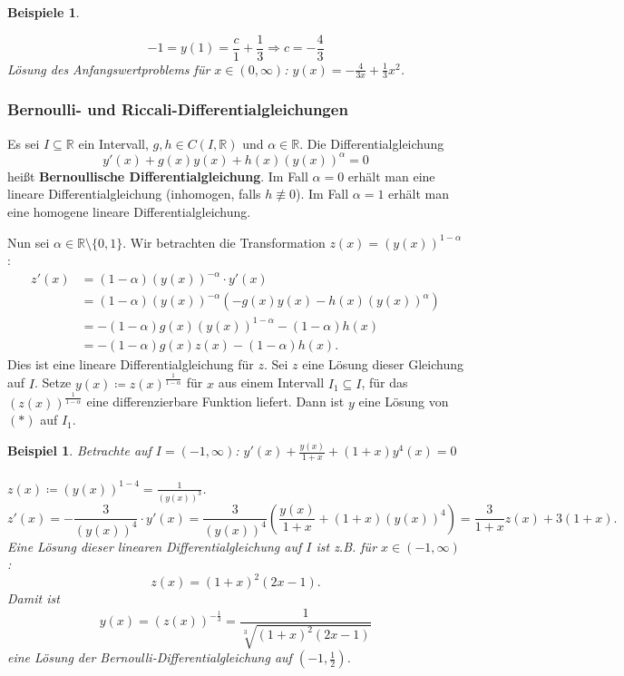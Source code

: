\documentclass[12pt]{extreport} %
\newcommand{\R}{\mathbb{R}}
\theoremstyle{named}
\theoremstyle{nnamed}
\theoremstyle{itshape}
\theoremstyle{normal}
\newtheorem*{beispiel*}{Beispiel}
\newtheorem*{beispiele}{Beispiele}
\begin{document}
\begin{beispiele}
\begin{enumerate}
		$$ - 1 = y(1) = \frac{c}{1} + \frac{1}{3} \Longrightarrow c = -\frac{4}{3} $$
		Lösung des Anfangswertproblems für $x \in (0, \infty)$: $y(x) = -\frac{4}{3x} + \frac{1}{3} x^{2}$.
	\end{enumerate}
\end{beispiele}	
	
 
\subsubsection*{Bernoulli- und Riccali-Differentialgleichungen}

Es sei $I \subseteq \R$ ein Intervall, $g, h \in C(I, \R)$ und $\alpha \in \R$. Die Differentialgleichung
	\begin{equation*}
		y'(x) + g(x) y(x) + h(x) \left( y(x) \right)^{\alpha} = 0 \tag*{$(*)$}
	\end{equation*}
hei{\ss}t \textbf{Bernoullische Differentialgleichung}. Im Fall $\alpha = 0$ erhält man eine lineare Differentialgleichung (inhomogen, falls $h \not\equiv 0$). Im Fall $\alpha = 1$ erhält man eine homogene lineare Differentialgleichung.

\bigskip

Nun sei $\alpha \in \R \setminus \{ 0, 1 \}$. Wir betrachten die Transformation $z(x) = \left( y(x) \right)^{1-\alpha}$:
	\begin{align*}
		z'(x) & = (1-\alpha) \left( y(x) \right)^{-\alpha} \cdot y'(x) \\ 
			  & = (1-\alpha) \left( y(x) \right)^{-\alpha} \left( -g(x)y(x) - h(x) \left( y(x) \right)^{\alpha} \right) \\
			  & = - (1-\alpha) g(x) \left( y(x) \right)^{1-\alpha} - (1 - \alpha) h(x) \\
			  & = - (1-\alpha) g(x) z(x) - (1-\alpha) h(x). 
	\end{align*} 
Dies ist eine lineare Differentialgleichung für $z$. Sei $z$ eine Lösung dieser Gleichung auf $I$. Setze 	$y(x) \coloneqq z(x)^{\frac{1}{1 -\alpha}}$ für $x$ aus einem Intervall $I_{1} \subseteq I$, für das $\left( z(x) \right)^{\frac{1}{1 - \alpha}}$ eine differenzierbare Funktion liefert. Dann ist $y$ eine Lösung von $(*)$ auf $I_{1}$. 

\bigskip

\begin{beispiel*}
	Betrachte auf $I = (-1, \infty)$: $y'(x) + \frac{y(x)}{1 + x} + (1+x) y^{4}(x) = 0$ ~\\
	$z(x) \coloneqq \left( y(x) \right)^{1-4} = \frac{1}{\left( y(x) \right)^{3}}$.
		$$ z'(x) = -\frac{3}{\left( y(x) \right)^{4}} \cdot y'(x) = \frac{3}{\left( y(x) \right)^{4}} \left( \frac{y(x)}{1 + x} + (1+x) \left( y(x) \right)^{4} \right) = \frac{3}{1+x} z(x) + 3(1+x). $$
	Eine Lösung dieser linearen Differentialgleichung auf $I$ ist z.B. für $x \in (-1, \infty)$:
		$$ z(x) = (1+x)^{2} (2x - 1). $$
	Damit ist 
		$$ y(x) = \left( z(x) \right)^{-\frac{1}{3}} = \frac{1}{\sqrt[3]{(1+x)^{2} (2x - 1)}} $$
	eine Lösung der Bernoulli-Differentialgleichung auf $\left( -1, \frac{1}{2}\right)$. 
\end{beispiel*}
\end{document}
